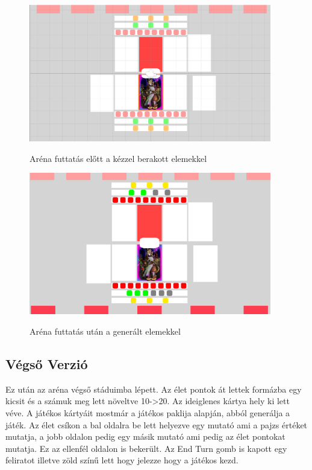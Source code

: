 \begin{figure}[h]
        \centering
        \includegraphics[width=400px,keepaspectratio]{images/board1.png}
        \label{ArenaLvl3_v1}
        \caption {Aréna futtatás előtt a kézzel berakott elemekkel}
    \hspace{1em}
\end{figure}
\begin{figure}[h]
        \centering
        \includegraphics[width=400px,keepaspectratio]{images/board2.png}
        \label{ArenaLvl3_v2}
        \caption {Aréna futtatás után a generált elemekkel}
    \hspace{1em}
\end{figure}

\clearpage

\subsection{Végső Verzió}
Ez után az aréna végső stáduimba lépett. Az élet pontok át lettek formázba egy kicsit és a számuk meg lett növeltve 10->20. Az ideiglenes kártya hely ki lett véve. A játékos kártyáit mostmár a játékos paklija alapján, abból generálja a játék. Az élet csíkon a bal oldalra be lett helyezve egy mutató ami a pajzs értéket mutatja, a jobb oldalon pedig egy másik mutató ami pedig az élet pontokat mutatja. Ez az ellenfél oldalon is bekerült. Az End Turn gomb is kapott egy feliratot illetve zöld színű lett hogy jelezze hogy a játékos kezd.

